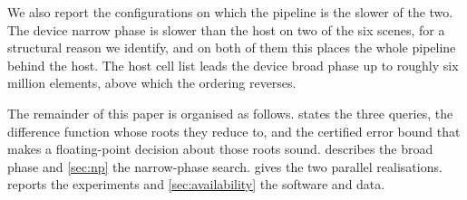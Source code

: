 We also report the configurations on which the pipeline is the slower of the
two. The device narrow phase is slower than the host on two of the six scenes,
for a structural reason we identify, and on both of them this places the whole
pipeline behind the host. The host cell list leads the device broad phase up to
roughly six million elements, above which the ordering reverses.

The remainder of this paper is organised as follows.  states
the three queries, the difference function whose roots they reduce to, and the
certified error bound that makes a floating-point decision about those roots
sound.  describes the broad phase and \cref{sec:np} the
narrow-phase search.  gives the two parallel realisations.
 reports the experiments and \cref{sec:availability} the
software and data.
